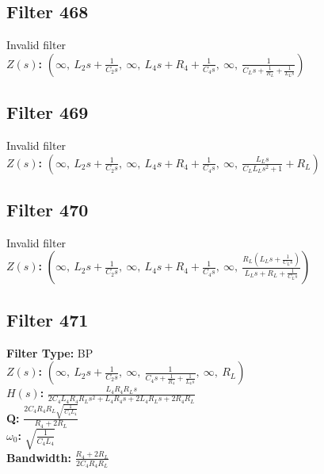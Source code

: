 \documentclass{article}
\begin{document}
\subsection*{Filter 468}
Invalid filter \\ 
\textbf{$Z(s)$:} $\left( \infty, \  L_{2} s + \frac{1}{C_{2} s}, \  \infty, \  L_{4} s + R_{4} + \frac{1}{C_{4} s}, \  \infty, \  \frac{1}{C_{L} s + \frac{1}{R_{L}} + \frac{1}{L_{L} s}}\right)$ \\ 
\subsection*{Filter 469}
Invalid filter \\ 
\textbf{$Z(s)$:} $\left( \infty, \  L_{2} s + \frac{1}{C_{2} s}, \  \infty, \  L_{4} s + R_{4} + \frac{1}{C_{4} s}, \  \infty, \  \frac{L_{L} s}{C_{L} L_{L} s^{2} + 1} + R_{L}\right)$ \\ 
\subsection*{Filter 470}
Invalid filter \\ 
\textbf{$Z(s)$:} $\left( \infty, \  L_{2} s + \frac{1}{C_{2} s}, \  \infty, \  L_{4} s + R_{4} + \frac{1}{C_{4} s}, \  \infty, \  \frac{R_{L} \left(L_{L} s + \frac{1}{C_{L} s}\right)}{L_{L} s + R_{L} + \frac{1}{C_{L} s}}\right)$ \\ 
\subsection*{Filter 471}
\textbf{Filter Type:} BP \\ 
\textbf{$Z(s)$:} $\left( \infty, \  L_{2} s + \frac{1}{C_{2} s}, \  \infty, \  \frac{1}{C_{4} s + \frac{1}{R_{4}} + \frac{1}{L_{4} s}}, \  \infty, \  R_{L}\right)$ \\ 
\textbf{$H(s)$:} $\frac{L_{4} R_{4} R_{L} s}{2 C_{4} L_{4} R_{4} R_{L} s^{2} + L_{4} R_{4} s + 2 L_{4} R_{L} s + 2 R_{4} R_{L}}$ \\ 
\textbf{Q:} $\frac{2 C_{4} R_{4} R_{L} \sqrt{\frac{1}{C_{4} L_{4}}}}{R_{4} + 2 R_{L}}$ \\ 
\textbf{$\omega_0$:} $\sqrt{\frac{1}{C_{4} L_{4}}}$ \\ 
\textbf{Bandwidth:} $\frac{R_{4} + 2 R_{L}}{2 C_{4} R_{4} R_{L}}$ \\ 
\end{document}
